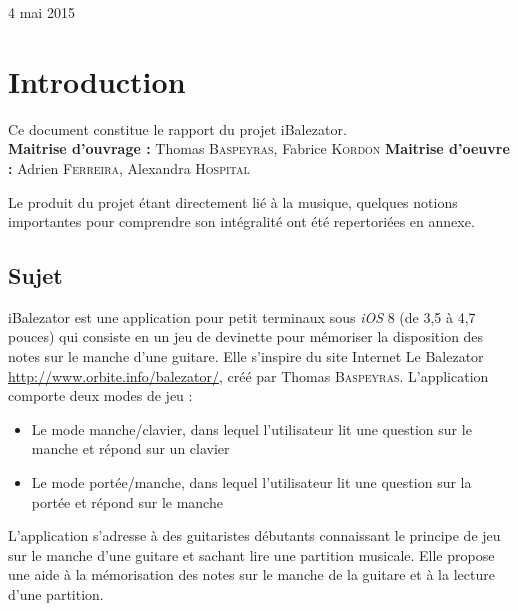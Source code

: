 \documentclass{scrreprt}
\begin{document}
\begin{titlepage}
\begin{sffamily}
\begin{center}
    \vfill

    {\large 4 mai 2015}

  \end{center}
  \end{sffamily}
\end{titlepage}

\tableofcontents \newpage

\setlength{\parindent}{1cm}
\chapter{Introduction}

\noindent Ce document constitue le rapport du projet iBalezator.\\
\noindent \textbf{Maitrise d'ouvrage :} Thomas \textsc{Baspeyras}, Fabrice \textsc{Kordon} \newline
\noindent \textbf{Maitrise d'oeuvre :} Adrien \textsc{Ferreira}, Alexandra \textsc{Hospital}\newline
\smallbreak

Le produit du projet étant directement lié à la musique, quelques notions importantes pour comprendre son intégralité ont été repertoriées en annexe.

\section{Sujet}

iBalezator est une application pour petit terminaux sous \textit{iOS} 8 (de 3,5 à 4,7 pouces) qui consiste en un jeu de devinette pour mémoriser la disposition des notes sur le manche d’une guitare. 
Elle s'inspire du site Internet Le Balezator \url{http://www.orbite.info/balezator/}, créé par Thomas \textsc{Baspeyras}.
\noindent L'application comporte deux modes de jeu : 
\begin{itemize}
\item Le mode manche/clavier, dans lequel l'utilisateur lit une question sur le manche et répond sur un clavier
\item Le mode portée/manche, dans lequel l'utilisateur lit une question sur la portée et répond sur le manche
\end{itemize}

L’application s’adresse à des guitaristes débutants connaissant le principe de jeu sur le manche d'une guitare et sachant lire une partition musicale. Elle propose une aide à la mémorisation des notes sur le manche de la guitare et à la lecture d’une partition.
\end{document}
